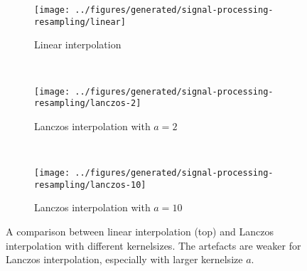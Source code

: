 

%
\begin{figure}
    \begin{subfigure}{\textwidth}
        \texttt{[image: ../figures/generated/signal-processing-resampling/linear]}
        \caption{Linear interpolation}
    \end{subfigure}
    ~
    \begin{subfigure}{\textwidth}
        \texttt{[image: ../figures/generated/signal-processing-resampling/lanczos-2]}
        \caption{Lanczos interpolation with $a=2$}
    \end{subfigure}
    ~
    \begin{subfigure}{\textwidth}
        \texttt{[image: ../figures/generated/signal-processing-resampling/lanczos-10]}
        \caption{Lanczos interpolation with $a=10$}
    \end{subfigure}
    \caption{A comparison between linear interpolation (top) and Lanczos interpolation with different kernelsizes. The artefacts are weaker for Lanczos interpolation, especially with larger kernelsize $a$.}
    \label{fig:theory:signal-processing:resampling}
\end{figure}





%
%
%

